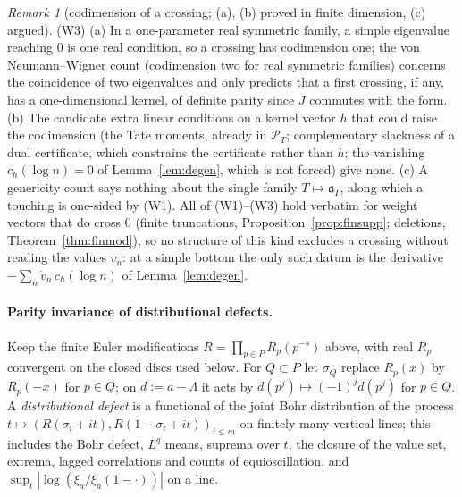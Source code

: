 \documentclass[11pt]{amsart}
\theoremstyle{definition}
\theoremstyle{remark}
\newtheorem{remark}[theorem]{Remark}
\newcommand{\PT}{\mathcal P_T}
\begin{document}
\begin{remark}[codimension of a crossing; (a), (b) proved in finite dimension, (c) argued]\label{rem:geo-codim}
(W3) (a) In a one-parameter real symmetric family, a simple eigenvalue reaching $0$ is one real condition, so a crossing has
codimension one; the von Neumann--Wigner count (codimension two for real symmetric families) concerns the coincidence of two
eigenvalues and only predicts that a first crossing, if any, has a one-dimensional kernel, of definite parity since $J$ commutes
with the form. (b) The candidate extra linear conditions on a kernel vector $h$ that could raise the codimension (the Tate moments,
already in $\PT$; complementary slackness of a dual certificate, which constrains the certificate rather than $h$; the vanishing
$c_h(\log n)=0$ of Lemma~\ref{lem:degen}, which is not forced) give none. (c) A genericity count says nothing about the single
family $T\mapsto\mathfrak a_T$, along which a touching is one-sided by (W1). All of (W1)--(W3) hold verbatim for weight vectors that
do cross $0$ (finite truncations, Proposition~\ref{prop:finsupp}; deletions, Theorem~\ref{thm:finmod}), so no structure of this kind
excludes a crossing without reading the values $v_n$: at a simple bottom the only such datum is the derivative
$-\sum_n\dot v_n\,c_{h}(\log n)$ of Lemma~\ref{lem:degen}.
\end{remark}

\paragraph{Parity invariance of distributional defects.}
Keep the finite Euler modifications $R=\prod_{p\in P}R_p(p^{-s})$ above, with real $R_p$ convergent on the closed discs used below. For
$Q\subset P$ let $\sigma_Q$ replace $R_p(x)$ by $R_p(-x)$ for $p\in Q$; on $d:=a-\Lambda$ it acts by $d(p^j)\mapsto(-1)^jd(p^j)$ for $p\in Q$.
A \emph{distributional defect} is a functional of the joint Bohr distribution of the process
$t\mapsto(R(\sigma_i+it),R(1-\sigma_i+it))_{i\le m}$ on finitely many vertical lines; this includes the Bohr defect, $L^q$ means, suprema
over $t$, the closure of the value set, extrema, lagged correlations and counts of equioscillation, and $\sup_t|\log(\xi_a/\xi_a(1-\cdot))|$
on a line.
\end{document}

